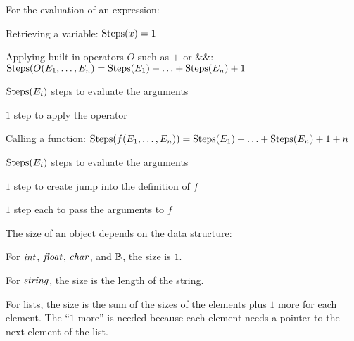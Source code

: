 \begin{example}
For the evaluation of an expression:
\begin{compactitem}
 \item Retrieving a variable: $\mathrm{Steps}(x)=1$
 \item Applying built-in operators $O$ such as $+$ or $\&\&$: $\mathrm{Steps}(O(E_1,\ldots, E_n)=\mathrm{Steps}(E_1)+\ldots+\mathrm{Steps}(E_n)+1$
  \begin{compactitem}
    \item $\mathrm{Steps}(E_i)$ steps to evaluate the arguments
    \item $1$ step to apply the operator
  \end{compactitem}  
 \item Calling a function: $\mathrm{Steps}(f(E_1,\ldots,E_n))=\mathrm{Steps}(E_1)+\ldots+\mathrm{Steps}(E_n)+1+n$
  \begin{compactitem}
    \item $\mathrm{Steps}(E_i)$ steps to evaluate the arguments
    \item $1$ step to create jump into the definition of $f$
    \item $1$ step each to pass the arguments to $f$
  \end{compactitem}
\end{compactitem}

The size of an object depends on the data structure:
\begin{compactitem}
  \item For $\mathit{int}$, $\mathit{float}$, $\mathit{char}$, and $\mathbb{B}$, the size is $1$.
  \item For $\mathit{string}$, the size is the length of the string.
  \item For lists, the size is the sum of the sizes of the elements plus $1$ more for each element.
   The ``$1$ more'' is needed because each element needs a pointer to the next element of the list.
\end{compactitem}
\end{example}

